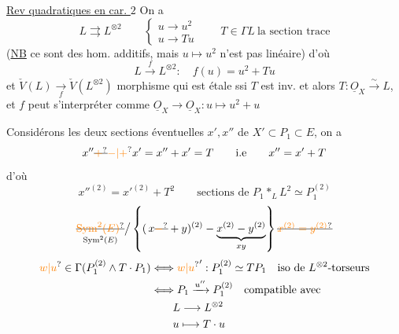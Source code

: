\uline{Rev quadratiques en car. $2$}
On a
\[
L\rightrightarrows L^{\otimes2}\qquad\begin{cases}u\longrightarrow u^2\\u\longrightarrow Tu\end{cases}\qquad T\in\Gamma L\ \text{la section trace}
\]
(\uline{NB} ce sont des hom. additifs, mais $u\mapsto u^2$ n'est pas linéaire)
d'où
\[
L\xrightarrow{f}L^{\otimes2}:\quad f(u)=u^2+Tu
\]
et $\check V(L)\underset f\longrightarrow\check V(L^{\otimes2})$ morphisme qui est étale ssi $T$ est inv.
 et alors $T:\underline O_X\xrightarrow{\sim}L$, et $f$ peut s'interpréter comme $\underline O_X\longrightarrow\underline O_X:u\longmapsto u^2+u$

Considérons  les deux sections éventuelles $x',x''$ de $X'\subset P_1\subset E$, on a
\[
x''\deleted{\unsure{+}}\unsure{-|+}x'=x''+x'=T\qquad\text{i.e}\qquad x''=x'+T
\]
d'où
\[
{x''}^{(2)}={x'}^{(2)}+T^2\qquad\text{sections de }P_1\mathbin{*}_L L^2\simeq P_1^{(2)}
\]
\[
\underset{\mathrm{Sym}^2(E)}{\deleted{\unsure{\mathrm{Sym}^2(E)}}}\big/\left\{(\,x\deleted{\unsure{-}}+y)^{(2)}-\underbrace{x^{(2)}-y^{(2)}}_{xy}\right\}\deleted{\unsure{x^{(2)}=y^{(2)}}}
\]
\[
\begin{aligned}\unsure{w|u}\in\Gamma(P_1^{(2)}\wedge T\cdot P_1)&\Longleftrightarrow {\unsure{w|u}}': P_1^{(2)}\simeq TP_1\quad\text{iso de }L^{\otimes2}\text{-torseurs}\\ &\Longleftrightarrow P_1\xrightarrow{u''}P_1^{(2)}\quad\text{compatible avec}\\ &\qquad L\longrightarrow L^{\otimes2}\\ &\qquad u\longmapsto T\cdot u\end{aligned}
\]


